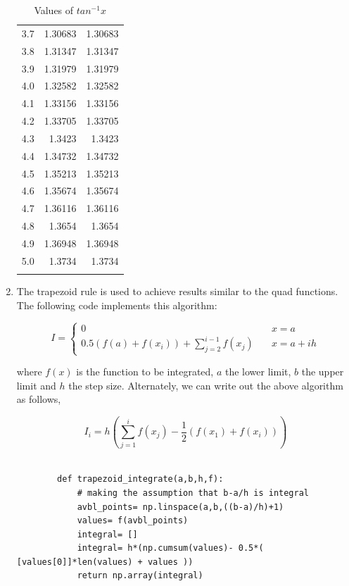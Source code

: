 \documentclass[a4paper, 12pt, margin= 1.25cm ]{article}
\begin{document}
\begin{enumerate}
\begin{center}
\begin{longtable}{c|r|r}
				3.7 & 1.30683 & 1.30683\\ 
				3.8 & 1.31347 & 1.31347\\ 
				3.9 & 1.31979 & 1.31979\\ 
				4.0 & 1.32582 & 1.32582\\ 
				4.1 & 1.33156 & 1.33156\\ 
				4.2 & 1.33705 & 1.33705\\ 
				4.3 & 1.3423 & 1.3423\\ 
				4.4 & 1.34732 & 1.34732\\ 
				4.5 & 1.35213 & 1.35213\\ 
				4.6 & 1.35674 & 1.35674\\ 
				4.7 & 1.36116 & 1.36116\\ 
				4.8 & 1.3654 & 1.3654\\ 
				4.9 & 1.36948 & 1.36948\\ 
				5.0 & 1.3734 & 1.3734\\ 

				\hline
				\addlinespace
				\caption{Values of $tan^{-1}x$}
				\label{tab:table1}

				\end{longtable}
			\end{center}
			
		\item The trapezoid rule is used to achieve results similar to the quad functions. The following code implements this algorithm:
			
			$$I= \left\{
					\begin{array}{ll}
						0 & \quad x = a \\
						0.5(f(a) + f(x_i)) + \sum_{j=2}^{i-1}f(x_j) & \quad x = a+ih
					\end{array}
				\right.
				$$	

		where $f(x)$ is the function to be integrated, $a$ the lower limit, $b$ the upper limit and $h$ the step size. Alternately, we can write out the above algorithm as follows,

		\begin{equation*}
		I_i = h \left(\sum_{j=1}^{i}f(x_j)- \frac{1}{2}(f(x_1) + f(x_i))\right)
		\end{equation*}
			 

		\begin{lstlisting}

		def trapezoid_integrate(a,b,h,f):
			# making the assumption that b-a/h is integral
			avbl_points= np.linspace(a,b,((b-a)/h)+1)	
			values= f(avbl_points)
			integral= []
			integral= h*(np.cumsum(values)- 0.5*( [values[0]]*len(values) + values ))
			return np.array(integral)



\end{lstlisting}
\end{enumerate}
\end{document}
